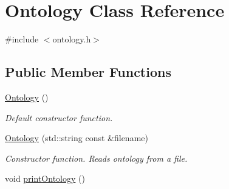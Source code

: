 \hypertarget{classOntology}{\section{\-Ontology \-Class \-Reference}
\label{classOntology}
}


{\ttfamily \#include $<$ontology.\-h$>$}

\subsection*{\-Public \-Member \-Functions}
\begin{DoxyCompactItemize}
\item 
\hypertarget{classOntology_a7c32cc412fe76fd5b148f52dd4bc0646}{\hyperlink{classOntology_a7c32cc412fe76fd5b148f52dd4bc0646}{\-Ontology} ()}\label{classOntology_a7c32cc412fe76fd5b148f52dd4bc0646}

\begin{DoxyCompactList}\small\item\em \-Default constructor function. \end{DoxyCompactList}\item 
\hyperlink{classOntology_af40ff2f6c4d2ca5591cee73a4c2f0931}{\-Ontology} (std\-::string const \&filename)
\begin{DoxyCompactList}\small\item\em \-Constructor function. \-Reads ontology from a file. \end{DoxyCompactList}\item 
\hypertarget{classOntology_abb418d4161d0576757eceb3cbb8535ce}{void \hyperlink{classOntology_abb418d4161d0576757eceb3cbb8535ce}{print\-Ontology} ()}\label{classOntology_abb418d4161d0576757eceb3cbb8535ce}


\end{DoxyCompactItemize}
